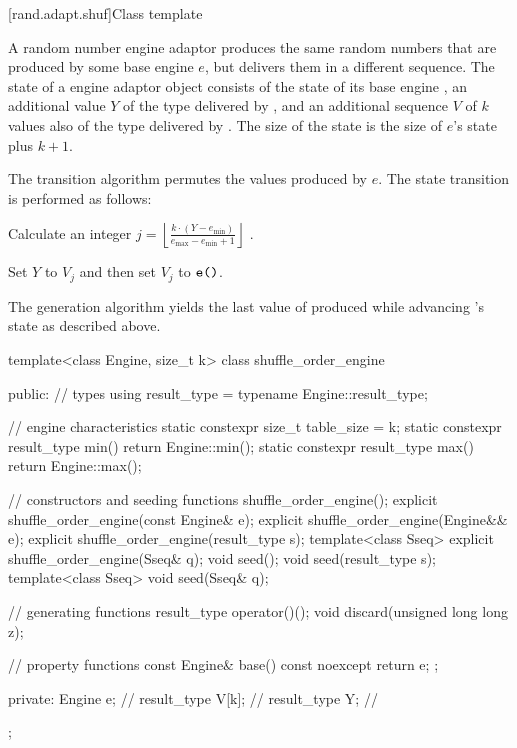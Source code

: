 [rand.adapt.shuf]{Class template }%
%

\pnum
A  random number engine adaptor
produces the same random numbers
that are produced by some base engine $e$,
but delivers them in a different sequence.
The state%
%
of a  engine adaptor object 
consists of
 the state  of its base engine ,
 an additional value $Y$ of the type delivered by ,
and
 an additional sequence $V$ of $k$ values
 also of the type delivered by .
The size of the state is
 the size of $e$'s state plus $k + 1$.

\pnum
The transition algorithm%
%
permutes the values produced by $e$.
The state transition is performed as follows:
\begin{enumeratea}
 \item
   Calculate an integer
   $j = \left\lfloor \frac{k \cdot (Y - e_{\min})}
                          {e_{\max} - e_{\min} +1}
        \right\rfloor
   $%
   .
 \item
   Set $Y$ to $V_j$ and then set $V_j$ to $\texttt{e()}$.
\end{enumeratea}

\pnum
The generation algorithm%
%
yields the last value of 
 produced while advancing 's state as described above.

%
\begin{codeblock}
template<class Engine, size_t k>
  class shuffle_order_engine {
  public:
    // types
    using result_type = typename Engine::result_type;

    // engine characteristics
    static constexpr size_t table_size = k;
    static constexpr result_type min() { return Engine::min(); }
    static constexpr result_type max() { return Engine::max(); }

    // constructors and seeding functions
    shuffle_order_engine();
    explicit shuffle_order_engine(const Engine& e);
    explicit shuffle_order_engine(Engine&& e);
    explicit shuffle_order_engine(result_type s);
    template<class Sseq> explicit shuffle_order_engine(Sseq& q);
    void seed();
    void seed(result_type s);
    template<class Sseq> void seed(Sseq& q);

    // generating functions
    result_type operator()();
    void discard(unsigned long long z);

    // property functions
    const Engine& base() const noexcept { return e; };

  private:
    Engine e;           // \expos
    result_type V[k];   // \expos
    result_type Y;      // \expos
  };
\end{codeblock}

